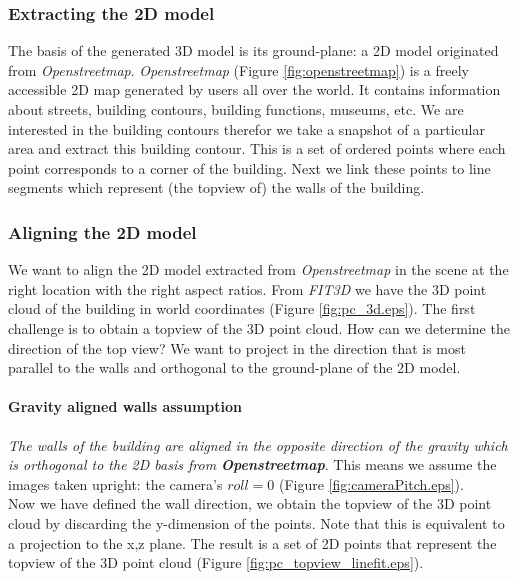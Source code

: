 \subsubsection{Extracting the 2D model}
The basis of the generated 3D model is its ground-plane: a 2D model originated from
\emph{Openstreetmap}.
\emph{Openstreetmap} (Figure \ref{fig:openstreetmap}) is a freely accessible 2D map generated by
users all over the world. It contains information about streets, building
contours, building functions, museums, etc.  We are interested in the building
contours therefor we take a snapshot of a particular area and extract this building
contour.  This is a set of ordered points where each point corresponds to a
corner of the building.  Next we link these points to line segments which
represent (the topview of) the walls of the building.

\subsubsection{Aligning the 2D model}
We want to align the 2D model extracted from \emph{Openstreetmap} in the scene at the right location with the right aspect ratios. 
From \emph{FIT3D\cite{fit3d}} we have the 3D point cloud of the building in world coordinates
(Figure \ref{fig:pc_3d.eps}).
The first challenge is to obtain a topview of the 3D point cloud.
How can we determine the direction of the top view? We want to project in the
direction that is most parallel to the walls and orthogonal to the ground-plane of the 2D model.

\paragraph{Gravity aligned walls assumption}
	\emph{The walls of the building are aligned in the opposite direction of the gravity
	which is orthogonal to the 2D basis from \textbf{Openstreetmap}}. This means
	we assume the images taken upright: the camera's $roll=0$ (Figure
	\ref{fig:cameraPitch.eps}).\\

Now we have defined the wall direction, we obtain the topview of the 3D point
cloud by discarding the y-dimension of the points.  Note that this is equivalent to a
projection to the x,z plane. The result is a set of 2D points that represent the
topview of the 3D point cloud (Figure \ref{fig:pc_topview_linefit.eps}).

